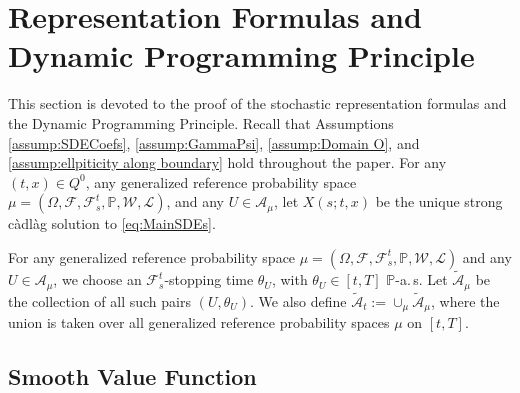 \documentclass[amscd,amssymb,11pt]{article}
\numberwithin{theorem}{section}
\numberwithin{equation}{section}
\let\Section=\section
\def\section{\setcounter{equation}{0}\Section}\sf
\begin{document}
\section{Representation Formulas and Dynamic Programming Principle}\label{sec:DP}



This section is devoted to the proof of the stochastic representation formulas and the Dynamic Programming Principle. Recall that Assumptions \ref{assump:SDECoefs}, \ref{assump:GammaPsi}, \ref{assump:Domain O}, and \ref{assump:ellpiticity along boundary} hold throughout the paper. For any $(t,x)\in Q^{0}$, any generalized reference probability space $\mu=(\Omega,\mathscr{F},\mathscr{F}_{s}^{t},\mathbb{P},\mathcal{W},\mathcal{L})$, and any $U\in\mathcal{A}_{\mu}$, let $X(s;t,x)$ be the unique strong c\`{a}dl\`{a}g solution to \eqref{eq:MainSDEs}.

For any generalized reference probability space $\mu=(\Omega,\mathscr{F},\mathscr{F}_{s}^{t},\mathbb{P},\mathcal{W},\mathcal{L})$ and any $U\in\mathcal{A}_{\mu}$, we choose an $\mathscr{F}_{s}^{t}$-stopping time $\theta_{U}$, with $\theta_{U}\in[t,T]$ $\mathbb{P}$-a.$\,$s. Let $\widetilde{\mathcal{A}}_{\mu}$ be the collection of all such pairs $(U,\theta_{U})$. We also define $\widetilde{\mathcal{A}}_{t}:=\cup_{\mu}\widetilde{\mathcal{A}}_{\mu}$, where the union is taken over all generalized reference probability spaces $\mu$ on $[t,T]$.


\subsection{Smooth Value Function}\label{Subsec:DPSmoothSols}
\end{document}
